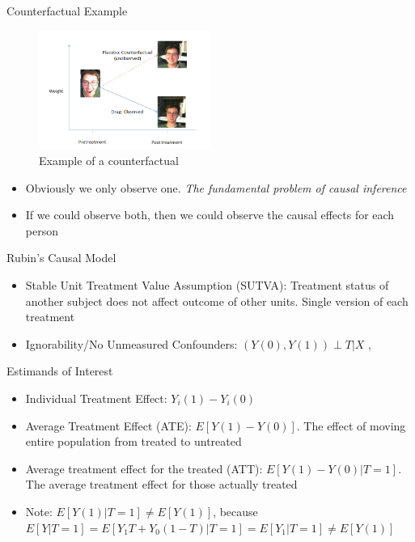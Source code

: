   
\begin{frame}{Counterfactual Example}
   \begin{figure}[h!]
  \centering
    \includegraphics[width=0.5\textwidth]{counterfactual.png}
    \caption{Example of a counterfactual}
\label{fig:counterfactual}
\end{figure}

\begin{itemize}
 \item Obviously we only observe one. \textit{The fundamental problem of causal inference}
\item If we could observe both, then we could observe the causal effects for each person
\end{itemize}
\end{frame}

\begin{frame}{Rubin's Causal Model}
\begin{itemize}
\item Stable Unit Treatment Value Assumption (SUTVA): Treatment status of another subject does not affect outcome of other units. Single version of each treatment
\item Ignorability/No Unmeasured Confounders: $(Y(0),Y(1))\perp T|X$ ,\cite{Rosenbaum1983}
\end{itemize}
\end{frame}




\begin{frame}{Estimands of Interest}
 \begin{itemize}
 \item Individual Treatment Effect: $Y_i(1)-Y_i(0)$
 \item Average Treatment Effect (ATE): $E[Y(1)-Y(0)]$. The effect of moving entire population
 from treated to untreated
 \item Average treatment effect for the treated (ATT): $E[Y(1)-Y(0)|T=1]$. The average treatment
 effect for those actually treated
 \item Note:  $E[Y(1)|T=1]\neq E[Y(1)]$, because $E[Y|T=1]=E[Y_1T+Y_0(1-T)|T=1]=E[Y_1|T=1]\neq E[Y(1)]$
\end{itemize}
 
\end{frame}


